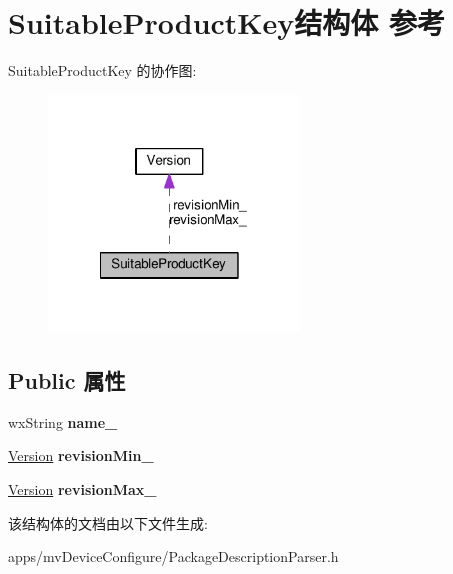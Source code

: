 \hypertarget{struct_suitable_product_key}{\section{Suitable\+Product\+Key结构体 参考}
\label{struct_suitable_product_key}
}


Suitable\+Product\+Key 的协作图\+:
\nopagebreak
\begin{figure}[H]
\begin{center}
\leavevmode
\includegraphics[width=189pt]{struct_suitable_product_key__coll__graph}
\end{center}
\end{figure}
\subsection*{Public 属性}
\begin{DoxyCompactItemize}
\item 
\hypertarget{struct_suitable_product_key_a92e8620ec0661a293c297d4a0ab11405}{wx\+String {\bfseries name\+\_\+}}\label{struct_suitable_product_key_a92e8620ec0661a293c297d4a0ab11405}

\item 
\hypertarget{struct_suitable_product_key_a8ea1ec42a353d4488284472d812336dc}{\hyperlink{struct_version}{Version} {\bfseries revision\+Min\+\_\+}}\label{struct_suitable_product_key_a8ea1ec42a353d4488284472d812336dc}

\item 
\hypertarget{struct_suitable_product_key_a51025dc13dc3e9dbea6106a002e98c2d}{\hyperlink{struct_version}{Version} {\bfseries revision\+Max\+\_\+}}\label{struct_suitable_product_key_a51025dc13dc3e9dbea6106a002e98c2d}

\end{DoxyCompactItemize}


该结构体的文档由以下文件生成\+:\begin{DoxyCompactItemize}
\item 
apps/mv\+Device\+Configure/Package\+Description\+Parser.\+h\end{DoxyCompactItemize}
